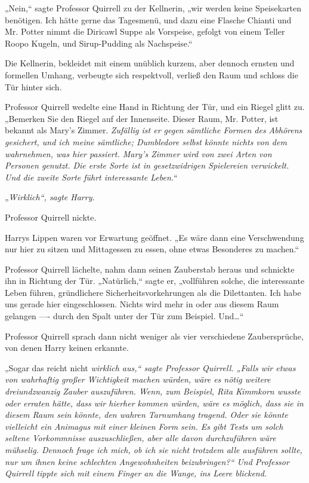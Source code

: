 {„Nein,“ sagte Professor Quirrell zu der Kellnerin, „wir werden keine Speisekarten benötigen. Ich hätte gerne das Tagesmenü, und dazu eine Flasche Chianti und Mr. Potter nimmt die Diricawl Suppe als Vorspeise, gefolgt von einem Teller Roopo Kugeln, und Sirup-Pudding als Nachspeise.“

Die Kellnerin, bekleidet mit einem unüblich kurzem, aber dennoch ernsten und formellen Umhang, verbeugte sich respektvoll, verließ den Raum und schloss die Tür hinter sich.

Professor Quirrell wedelte eine Hand in Richtung der Tür, und ein Riegel glitt zu. „Bemerken Sie den Riegel auf der Innenseite. Dieser Raum, Mr. Potter, ist bekannt als Mary's Zimmer. \emph{Zufällig ist er gegen sämtliche Formen des Abhörens gesichert, und ich meine \emph{sämtliche;} Dumbledore selbst könnte nichts von dem wahrnehmen, was hier passiert. Mary's Zimmer wird von zwei Arten von Personen genutzt. Die erste Sorte ist in gesetzwidrigen Spielereien verwickelt. Und die zweite Sorte führt interessante Leben.“}

„\emph{Wirklich“, sagte Harry.}

Professor Quirrell nickte.

Harrys Lippen waren vor Erwartung geöffnet. „Es wäre dann eine Verschwendung nur hier zu sitzen und Mittagessen zu essen, ohne etwas Besonderes zu machen.“

Professor Quirrell lächelte, nahm dann seinen Zauberstab heraus und schnickte ihn in Richtung der Tür. „Natürlich,“ sagte er, „vollführen solche, die interessante Leben führen, gründlichere Sicherheitsvorkehrungen als die Dilettanten. Ich habe uns gerade hier eingeschlossen. Nichts wird mehr in oder aus diesem Raum gelangen ---- durch den Spalt unter der Tür zum Beispiel. Und…“

Professor Quirrell sprach dann nicht weniger als vier verschiedene Zaubersprüche, von denen Harry keinen erkannte.

„Sogar das reicht nicht \emph{wirklich aus,“ sagte Professor Quirrell. „Falls wir etwas von wahrhaftig großer Wichtigkeit machen würden, wäre es nötig weitere dreiundzwanzig Zauber auszuführen. Wenn, zum Beispiel, Rita Kimmkorn wusste oder erraten hätte, dass wir hierher kommen würden, wäre es möglich, dass sie in diesem Raum sein könnte, den wahren Tarnumhang tragend. Oder sie könnte vielleicht ein Animagus mit einer kleinen Form sein. Es gibt Tests um solch seltene Vorkommnisse auszuschließen, aber alle davon durchzuführen wäre mühselig. Dennoch frage ich mich, ob ich sie nicht trotzdem alle ausführen sollte, nur um ihnen keine schlechten Angewohnheiten beizubringen?“ Und Professor Quirrell tippte sich mit einem Finger an die Wange, ins Leere blickend.}

}
